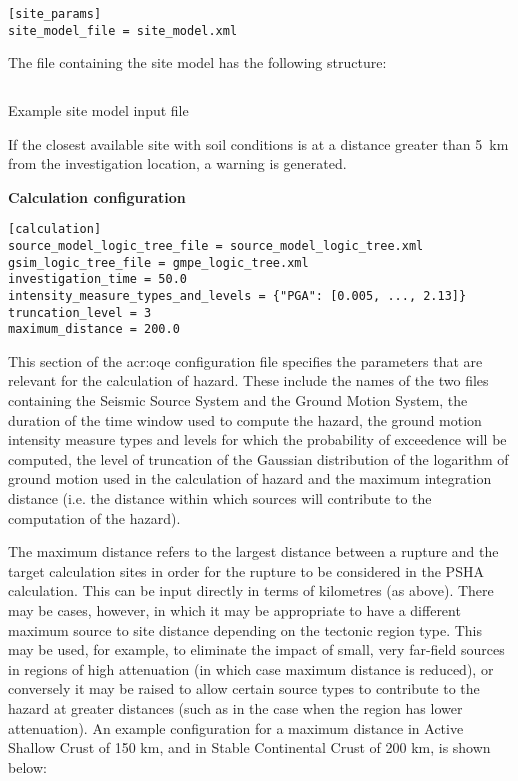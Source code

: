 \begin{verbatim}
[site_params]
site_model_file = site_model.xml
\end{verbatim}

The file containing the site model has the following structure:

\begin{listing}[htbp]
  \inputminted[firstline=1,firstnumber=1,fontsize=\footnotesize,frame=single,linenos,bgcolor=lightgray]{xml}{oqum/hazard/verbatim/input_site_model.xml}
  \caption{Example site model input file}
  \label{lst:input_site_model}
\end{listing}

If the closest available site with soil conditions is at a distance greater than 5~km from the investigation location, a warning is generated.

\textbf{Calculation configuration}
\label{sec:calculation_configuration}

\begin{verbatim}
[calculation]
source_model_logic_tree_file = source_model_logic_tree.xml
gsim_logic_tree_file = gmpe_logic_tree.xml
investigation_time = 50.0
intensity_measure_types_and_levels = {"PGA": [0.005, ..., 2.13]}
truncation_level = 3
maximum_distance = 200.0
\end{verbatim}

This section of the \gls{acr:oqe} configuration file specifies the parameters
that are relevant for the calculation of hazard. These include the names of
the two files containing the Seismic Source System and the Ground Motion
System, the duration of the time window used to compute the  hazard, the
ground motion intensity measure types and levels for  which the probability of
exceedence will be computed, the level of truncation of the Gaussian
distribution of the logarithm of ground motion used in the calculation of
hazard and the maximum integration distance (i.e. the distance within which
sources will contribute to the computation of the hazard).

The maximum distance refers to the largest distance between a rupture and the
target calculation sites in order for the rupture to be considered in the PSHA
calculation. This can be input directly in terms of kilometres (as above).
There may be cases, however, in which it may be appropriate to have a
different maximum source to site distance depending on the tectonic region
type. This may be used, for example, to eliminate the impact of small, very
far-field sources in regions of high attenuation (in which case maximum distance
is reduced), or conversely it may be raised to allow certain source types to
contribute to the hazard at greater distances (such as in the case when the
region has lower attenuation). An example configuration for a maximum distance
in Active Shallow Crust of 150 km, and in Stable Continental Crust of 200 km,
is shown below:

